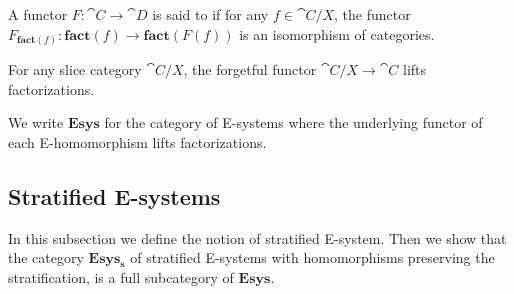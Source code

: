 \begin{defn}
A functor $F:\cat{C}\to\cat{D}$ is said to
 if for any $f\in\cat{C}/X$, the functor
$F_{\mathbf{fact}(f)}:\mathbf{fact}(f)\to\mathbf{fact}(F(f))$ is an isomorphism
of categories. 
\end{defn}

\begin{comment}
\begin{rmk}
We may choose the property of lifting factorizations
to involve either an equivalence or an isomorphism of categories. The
isomorphism-version, would say that for every factorization $h'\circ g'$
of $F(f)$ there is a unique factorization $f\jdeq h\circ g$ in $\cat{C}$ such
that $F(g)\jdeq g'$ and $F(h)\jdeq h'$. In the version with equivalences,
the uniqueness is replaced by uniqueness up to isomorphism, and the equalites
are replaced by an isomorphism in $\mathbf{fact}(F(f))$. 

It is easier to state the isomorphism version of lifting factorizations with
inference rules and it might be easier to explain this condition on type theoretical
grounds, although the equivalence version has the advantage of being
categorical (i.e.~invariant under equivalence of categories).

In the present
context, it doesn't matter very much which one we pick: the categories in which
we're interested are all posets.
\end{rmk}
\end{comment}

\begin{eg}
For any slice category $\cat{C}/X$, the forgetful functor $\cat{C}/X\to\cat{C}$
lifts factorizations.
\end{eg}

\begin{defn}
We write $\mathbf{Esys}$ for the category of E-systems where the underlying
functor of each E-homomorphism lifts factorizations.
\end{defn}

\subsection{Stratified E-systems}

In this subsection we define the notion of stratified E-system. Then we show
that the category $\mathbf{Esys_s}$ of stratified E-systems with homomorphisms preserving the
stratification, is a full subcategory of $\mathbf{Esys}$. 

